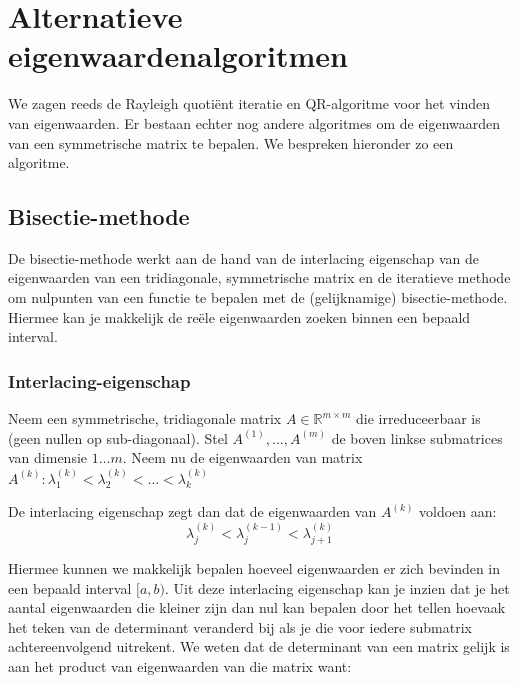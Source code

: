 \documentclass[a4paper]{article}
\begin{document}
\section{Alternatieve eigenwaardenalgoritmen}
	We zagen reeds de Rayleigh quotiënt iteratie en QR-algoritme voor het vinden van eigenwaarden. Er bestaan echter nog andere algoritmes om de eigenwaarden van een symmetrische matrix te bepalen. We bespreken hieronder zo een algoritme.
\subsection{Bisectie-methode}
	De bisectie-methode werkt aan de hand van de interlacing eigenschap van de eigenwaarden van een tridiagonale, symmetrische matrix en de iteratieve methode om nulpunten van een functie te bepalen met de (gelijknamige) bisectie-methode. Hiermee kan je makkelijk de reële eigenwaarden zoeken binnen een bepaald interval.
\subsubsection{Interlacing-eigenschap}
	Neem een symmetrische, tridiagonale matrix $A \in \mathbb{R}^{m\times m} $ die irreduceerbaar is (geen nullen op sub-diagonaal).
	Stel $A^{(1)},\dots ,A^{(m)}$ de boven linkse submatrices van dimensie $1\dots m$.
	Neem nu de eigenwaarden van matrix $A^{(k)}: \lambda _1^{(k)} < \lambda _2^{(k)} < \dots < \lambda _k^{(k)}$
	
	\noindent De interlacing eigenschap zegt dan dat de eigenwaarden van $A^{(k)}$ voldoen aan:
	\begin{equation}
		\lambda _j^{(k)} < \lambda_j^{(k-1)} < \lambda_{j+1}^{(k)}
	\end{equation}
	
	\noindent Hiermee kunnen we makkelijk bepalen hoeveel eigenwaarden er zich bevinden in een bepaald interval $[a,b)$. Uit deze interlacing eigenschap kan je inzien dat je het aantal eigenwaarden die kleiner zijn dan nul kan bepalen door het tellen hoevaak het teken van de determinant veranderd bij als je die voor iedere submatrix achtereenvolgend uitrekent. We weten dat de determinant van een matrix gelijk is aan het product van eigenwaarden van die matrix want:
	
\end{document}
